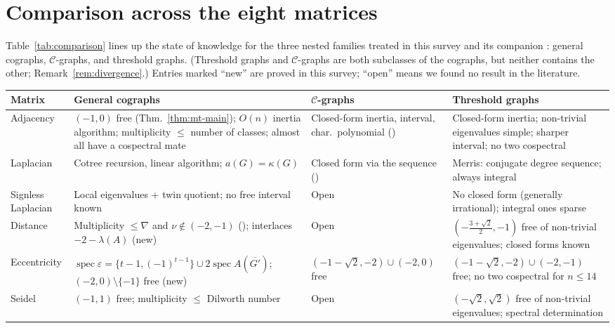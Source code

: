 \documentclass[11pt]{article}
\theoremstyle{plain}
\theoremstyle{definition}
\theoremstyle{remark}
\DeclareMathOperator{\spec}{spec}
\begin{document}
	
	\section{Comparison across the eight matrices}
	\label{sec:comparison}
	
	Table~\ref{tab:comparison} lines up the state of knowledge for the three nested families treated in this survey and its companion \cite{MannaMandal2026}: general cographs, $\mathcal{C}$-graphs, and threshold graphs. (Threshold graphs and $\mathcal{C}$-graphs are both subclasses of the cographs, but neither contains the other; Remark~\ref{rem:divergence}.) Entries marked ``new'' are proved in this survey; ``open'' means we found no result in the literature.
	
	\begin{table}[h]
		\centering
		\footnotesize
		\renewcommand{\arraystretch}{1.15}
		\begin{tabular}{@{}p{}p{}p{}p{}@{}}
			\toprule
			Matrix & General cographs & $\mathcal{C}$-graphs & Threshold graphs \\
			\midrule
			Adjacency & $(-1,0)$ free (Thm.~\ref{thm:mt-main}); $O(n)$ inertia algorithm; multiplicity $\le$ number of classes; almost all have a cospectral mate & Closed-form inertia, interval, char.\ polynomial (\cite{MandalMehatari2025}) & Closed-form inertia; non-trivial eigenvalues simple; sharper interval\cite{Ghorbani2019threshold}; no two cospectral \\
			Laplacian & Cotree recursion, linear algorithm; $a(G)=\kappa(G)$ & Closed form via the sequence (\cite{MandalMehatariStanic2024}) & Merris: conjugate degree sequence; always integral\cite{Merris1994} \\
			Signless Laplacian & Local eigenvalues + twin quotient; no free interval known & Open & No closed form (generally irrational); integral ones sparse \\
			Distance & Multiplicity $\le\nabla$ and $\nu\notin(-2,-1)$ (\cite{LouLin2020}); interlaces $-2-\lambda(A)$ (new) & Open & $(-\frac{3+\sqrt2}2,-1)$ free of non-trivial eigenvalues; closed forms known\cite{LuHuangLou2018} \\
			Eccentricity & $\spec\varepsilon=\{t-1,(-1)^{t-1}\}\cup2\spec A(\overline{G'})$; $(-2,0)\setminus\{-1\}$ free (new) & $(-1-\sqrt2,-2)\cup(-2,0)$ free\cite{AshokanEccentricity2025} & $(-1-\sqrt2,-2)\cup(-2,-1)$ free; no two cospectral for $n\le14$\cite{AndelicEtAl2023} \\
			Seidel & $(-1,1)$ free; multiplicity $\le$ Dilworth number\cite{LiWangBrunetti2024,NiuWang2024} & Open & $(-\sqrt2,\sqrt2)$ free of non-trivial eigenvalues; spectral determination\cite{MandalMehatari2024,XiongHou2022} \\

\end{tabular}
\end{table}
\end{document}
